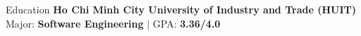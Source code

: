 \begin{rubric}{Education}
\entry*[2022 -- 2026]%
	\textbf{Ho Chi Minh City University of Industry and Trade (HUIT)}
	\newline Major: \textbf{Software Engineering} $|$ GPA: \textbf{3.36/4.0}
\end{rubric}